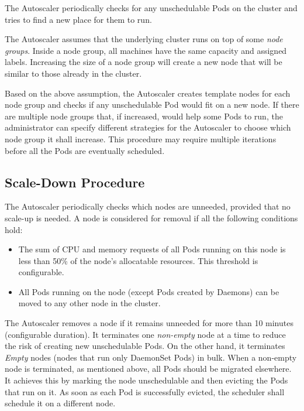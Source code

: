 \label{section:backgroud-scale-up}

The Autoscaler periodically checks for any unschedulable Pods on the cluster and
tries to find a new place for them to run.

The Autoscaler assumes that the underlying cluster runs on top of some
\textit{node groups}. Inside a node group, all machines have the same capacity
and assigned labels. Increasing the size of a node group will create a new node
that will be similar to those already in the cluster.

Based on the above assumption, the Autoscaler creates template nodes for each
node group and checks if any unschedulable Pod would fit on a new node. If there
are multiple node groups that, if increased, would help some Pods to run, the
administrator can specify different strategies for the Autoscaler to choose
which node group it shall increase. This procedure may require multiple
iterations before all the Pods are eventually scheduled.


\subsection{Scale-Down Procedure}
\label{section:backgroud-scale-down}

The Autoscaler periodically checks which nodes are unneeded, provided that no
scale-up is needed. A node is considered for removal if all the following
conditions hold:

\begin{itemize}
  \tightlist
  \item The sum of CPU and memory requests of all Pods running on this node is
  less than 50\% of the node's allocatable resources. This threshold is
  configurable.
  \item All Pods running on the node (except Pods created by Daemons) can be
  moved to any other node in the cluster. 
\end{itemize}

The Autoscaler removes a node if it remains unneeded for more than 10 minutes
(configurable duration). It terminates one \textit{non-empty} node at a time to
reduce the risk of creating new unschedulable Pods. On the other hand, it
terminates \textit{Empty} nodes (nodes that run only DaemonSet Pods) in bulk.
When a non-empty node is terminated, as mentioned above, all Pods should be
migrated elsewhere. It achieves this by marking the node unschedulable and then
evicting the Pods that run on it. As soon as each Pod is successfully evicted,
the scheduler shall schedule it on a different node.
